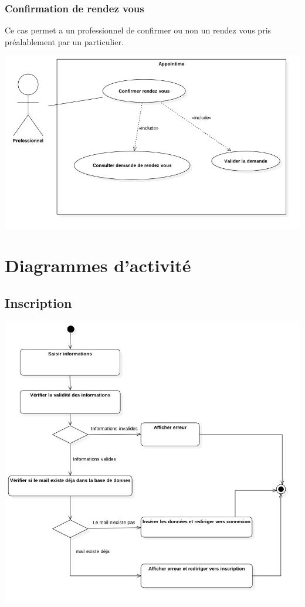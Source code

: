 \documentclass{article}
\begin{document}
\subsubsection{Confirmation de rendez vous}
Ce cas permet a un professionnel de confirmer ou non un rendez vous pris préalablement par un particulier.
\begin{center}
  \includegraphics[width=400pt]{diagram/useCaseConfirmerDemande}
\end{center}
\section{Diagrammes d'activité}
\subsection{Inscription}
\begin{center}
  \includegraphics[width=400pt]{diagram/activiteInscription}
\end{center}
\end{document}

